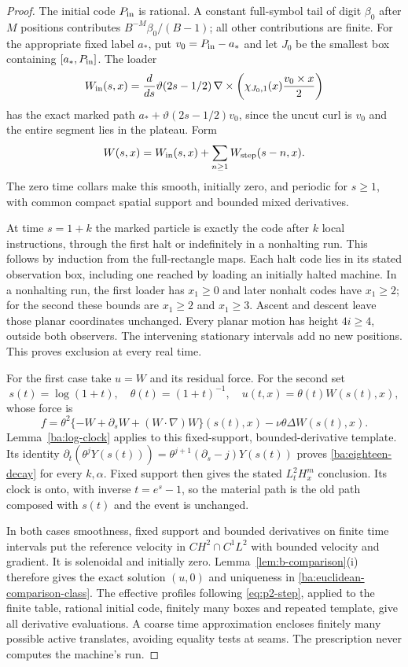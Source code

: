 \begin{proof}
The initial code $P_{\rm in}$ is rational.  A constant full-symbol
tail of digit $\beta_0$ after $M$ positions contributes
$B^{-M}\beta_0/(B-1)$; all other contributions are finite.  For the
appropriate fixed label $a_*$, put $v_0=P_{\rm in}-a_*$ and let
$J_0$ be the smallest box containing $[a_*,P_{\rm in}]$.  The loader
\[
 W_{\rm in}(s,x)=\frac d{ds}\vartheta(2s-1/2)\,
 \nabla\times\left(\chi_{J_0,1}(x)\frac{v_0\times x}{2}\right)
\]
has the exact marked path $a_*+\vartheta(2s-1/2)v_0$, since the
uncut curl is $v_0$ and the entire segment lies in the plateau.  Form
\[
 W(s,x)=W_{\rm in}(s,x)+\sum_{n\ge1}W_{\rm step}(s-n,x).
\]
The zero time collars make this smooth, initially zero, and periodic for
$s\ge1$, with common compact spatial support and bounded mixed derivatives.

At time $s=1+k$ the marked particle is exactly the code after $k$ local
instructions, through the first halt or indefinitely in a nonhalting run.
This follows by induction from the full-rectangle maps.  Each halt code
lies in its stated observation box, including one reached by loading an
initially halted machine.  In a nonhalting run, the first loader has
$x_1\ge0$ and later nonhalt codes have $x_1\ge2$; for the second these
bounds are $x_1\ge2$ and $x_1\ge3$.  Ascent and descent leave those
planar coordinates unchanged.  Every planar motion has height $4i\ge4$,
outside both observers.  The intervening stationary intervals add no new
positions.  This proves exclusion at every real time.

For the first case take $u=W$ and its residual force.  For the second set
\[
 s(t)=\log(1+t),\quad \theta(t)=(1+t)^{-1},\quad
 u(t,x)=\theta(t)W(s(t),x),
\]
whose force is
\[
 f=\theta^2\{-W+\partial_sW+(W\cdot\nabla)W\}(s(t),x)
                         -\nu\theta\Delta W(s(t),x).
\]
Lemma~\ref{ba:log-clock} applies to this fixed-support, bounded-derivative
template.  Its identity
$\partial_t(\theta^jY(s(t)))=\theta^{j+1}(\partial_s-j)Y(s(t))$
proves \eqref{ba:eighteen-decay} for every $k,\alpha$.  Fixed support
then gives the stated $L^2_tH^m_x$ conclusion.  Its clock is onto, with
inverse $t=e^s-1$, so the material path is the old path composed with
$s(t)$ and the event is unchanged.

In both cases smoothness, fixed support and bounded derivatives on
finite time intervals put the reference velocity in $CH^2\cap C^1L^2$
with bounded velocity and gradient.  It is solenoidal and initially zero.
Lemma~\ref{lem:b-comparison}(i) therefore gives the exact solution
$(u,0)$ and uniqueness in \eqref{ba:euclidean-comparison-class}.
The effective profiles following \eqref{eq:p2-step}, applied to the
finite table, rational initial code, finitely many boxes and repeated
template, give all derivative evaluations.  A coarse time approximation
encloses finitely many possible active translates, avoiding equality
tests at seams.  The prescription never computes the machine's run.
\end{proof}

